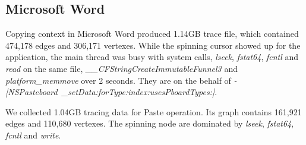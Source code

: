 \subsection{Microsoft Word}

Copying context in Microsoft Word produced 1.14GB trace file, which contained
474,178 edges and 306,171 vertexes.  While the spinning cursor showed up for
the application, the main thread was busy with system calls, \textit{lseek},
\textit{fstat64}, \textit{fcntl} and \textit{read} on the same file,
\textit{\_\_CFStringCreateImmutableFunnel3} and \textit{platform\_memmove} over
2 seconds.  They are on the behalf of \textit{-[NSPasteboard\
\_setData:forType:index:usesPboardTypes:]}.

We collected 1.04GB tracing data for Paste operation. Its graph contains
161,921 edges and 110,680 vertexes.  The spinning node are dominated by
\textit{lseek}, \textit{fstat64}, \textit{fcntl} and \textit{write}.
